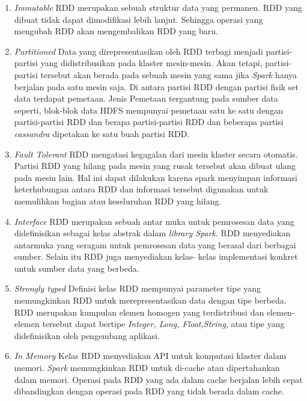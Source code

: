 \begin{enumerate}
	\item{\textit{Immutable}\newline
		RDD merupakan sebuah struktur data yang permanen. RDD yang dibuat tidak dapat 					
		dimodifikasi lebih lanjut. Sehingga operasi yang mengubah RDD akan mengembalikan RDD 			
		yang baru.
	}
	
	\item{\textit{Partitioned}\newline
	Data yang direpresentasikan oleh RDD terbagi menjadi partisi-partisi yang 						
	didistribusikan pada klaster mesin-mesin. Akan tetapi, partisi-partisi tersebut akan 			
	berada pada sebuah mesin yang sama jika \textit{Spark} hanya berjalan pada satu mesin 			
	saja. Di antara partisi RDD dengan partisi fisik set data terdapat pemetaan. Jenis 				
	Pemetaan tergantung pada sumber data seperti, blok-blok data HDFS mempunyai pemetaan 			
	satu ke satu dengan partisi-partisi RDD dan berapa partisi-partisi RDD dan beberapa 			
	partisi \textit{cassandra} dipetakan ke satu buah partisi RDD.
	}
	
	\item{\textit{Fault Tolerant}\newline
	RDD mengatasi kegagalan dari mesin klaster secara otomatis. Partisi RDD yang hilang 			
	pada mesin yang rusak tersebut akan dibuat ulang pada mesin lain. Hal ini dapat 				
	dilakukan karena spark menyimpan informasi keterhubungan antara RDD dan informasi 				
	tersebut digunakan untuk memulihkan bagian atau keseluruhan RDD yang hilang.
	}
	
	\item{\textit{Interface}\newline
	RDD merupakan sebuah antar muka untuk pemrosesan data yang didefinisikan sebagai kelas 			
	abstrak dalam \textit{library Spark}. RDD menyediakan antarmuka yang seragam untuk 				
	pemrosesan data yang berasal dari berbagai sumber. Selain itu RDD juga menyediakan kelas-		
	kelas implementasi konkret untuk sumber data yang berbeda.	
	}
	
	\item{\textit{Strongly typed}\newline
	Definisi kelas RDD mempunyai parameter tipe yang memungkinkan RDD untuk 						
	merepresentasikan data dengan tipe berbeda. RDD merupakan kumpulan elemen homogen yang 			
	terdistribusi dan elemen-elemen tersebut dapat bertipe \textit{Integer, Long, Float,String}, 
	atau tipe yang didefinisikan oleh pengembang aplikasi.
	}
	
	\item{\textit{In Memory}\newline
	Kelas RDD menyediakan API untuk komputasi klaster dalam memori. \textit{Spark} 			
	memungkinkan RDD untuk di-cache atau dipertahankan dalam memori. Operasi pada RDD yang 			
	ada dalam cache berjalan lebih cepat dibandingkan dengan operasi pada RDD yang tidak 			
	berada dalam cache.
	}
\end{enumerate}

